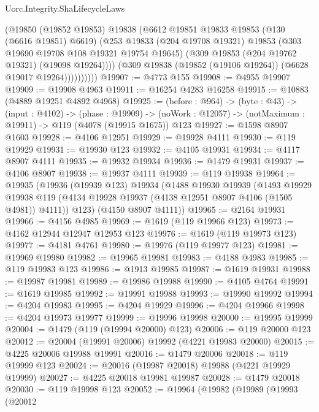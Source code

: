 \begin{lexlean}{Uorc.Integrity.ShaLifecycleLaws}
\begin{coremodule}
                  (@19850
                    (@19852 @19853)
                    @19838
                    (@6612
                      @19851
                      @19833
                      @19853
                      (@130 (@6616 @19851) @6619)
                      (@253
                        @19833
                        (@204 @19708 @19321)
                        @19853
                        (@303 @19690 @19708 @108 @19321 @19754 @19645)
                        (@309 @19853 (@204 @19762 @19321) (@19098 @19264))))
                    (@309 @19838 (@19852 (@19106 @19264)) (@6628 @19017 @19264))))))))))
@19907 := @4773 @155
@19908 := @4955 @19907
@19909 := @19908 @4963
@19911 := @16254 @4283 @16258
@19915 := @10883 (@4889 @19251 @4892 @4968)
@19925 := (before : @964) ->
  (byte : @43) ->
  (input : @4102) ->
  (phase : @19909) -> (noWork : @12057) -> (notMaximum : @19911) -> @119 (@4078 (@19915 @1675)) @123
@19927 := @1598 @8907 @1603
@19928 := @4106 @12951
@19929 := @19928 @4111
@19930 := @119 @19929
@19931 := @19930 @123
@19932 := @4105 @19931
@19934 := @4117 @8907 @4111
@19935 := @19932 @19934
@19936 := @1479 @19931
@19937 := @4106 @8907
@19938 := @19937 @4111
@19939 := @119 @19938
@19964 := @19935
    (@19936
      (@19939 @123)
      @19934
      (@1488
        @19930
        @19939
        (@1493
          @19929
          @19938
          @119
          (@4134 @19928 @19937 (@4138 @12951 @8907 @4106 (@1505 @4981)) @4111))
        @123)
      (@4150 @8907 @4111))
@19965 := @2164 @19931
@19966 := @4156 @4985
@19969 := @1619 (@119 @19966 @123)
@19973 := @4162 @12944 @12947 @12953 @123
@19976 := @1619 (@119 @19973 @123)
@19977 := @4181 @4761
@19980 := @19976 (@119 @19977 @123)
@19981 := @19969 @19980
@19982 := @19965 @19981
@19983 := @4188 @4983
@19985 := @119 @19983 @123
@19986 := @1913 @19985
@19987 := @1619 @19931
@19988 := @19987 @19981
@19989 := @19986 @19988
@19990 := @4105 @4764
@19991 := @1619 @19985
@19992 := @19991 @19988
@19993 := @19990 @19992
@19994 := @4204 @19983
@19995 := @4204 @19929
@19996 := @4204 @19966
@19998 := @4204 @19973 @19977
@19999 := @19996 @19998
@20000 := @19995 @19999
@20004 := @1479 (@119 (@19994 @20000) @123)
@20006 := @119 @20000 @123
@20012 := @20004 (@19991 @20006) @19992 (@4221 @19983 @20000)
@20015 := @4225 @20006 @19988 @19991
@20016 := @1479 @20006
@20018 := @119 @19999 @123
@20024 := @20016 (@19987 @20018) @19988 (@4221 @19929 @19999)
@20027 := @4225 @20018 @19981 @19987
@20028 := @1479 @20018
@20030 := @119 @19998 @123
@20052 := @19964
    (@19982
      (@19989
        (@19993
          (@20012

\end{coremodule}
\end{lexlean}
